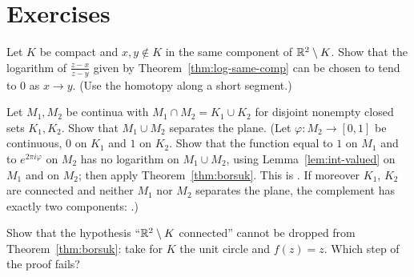 \section*{Exercises}

\begin{exercise}
Let $K$ be compact and $x,y\notin K$ in the same component of $\mathbb{R}^2\setminus K$. Show that the
logarithm of $\frac{z-x}{z-y}$ given by Theorem~\ref{thm:log-same-comp} can be chosen to tend to
$0$ as $x\to y$. (Use the homotopy along a short segment.)
\end{exercise}

\begin{exercise}[Mullikin]
Let $M_1,M_2$ be continua with $M_1\cap M_2=K_1\cup K_2$ for disjoint nonempty closed sets
$K_1,K_2$. Show that $M_1\cup M_2$ separates the plane. (Let $\varphi\colon M_2\to[0,1]$ be continuous,
$0$ on $K_1$ and $1$ on $K_2$. Show that the function equal to $1$ on $M_1$ and to $e^{2\pi i\varphi}$
on $M_2$ has no logarithm on $M_1\cup M_2$, using Lemma~\ref{lem:int-valued} on $M_1$ and on $M_2$;
then apply Theorem~\ref{thm:borsuk}. This is . If
moreover $K_1$, $K_2$ are connected and neither $M_1$ nor $M_2$ separates the plane, the complement
has exactly two components: .)
\end{exercise}

\begin{exercise}
Show that the hypothesis ``$\mathbb{R}^2\setminus K$ connected'' cannot be dropped from
Theorem~\ref{thm:borsuk}: take for $K$ the unit circle and $f(z)=z$. Which step of the proof
fails?
\end{exercise}
